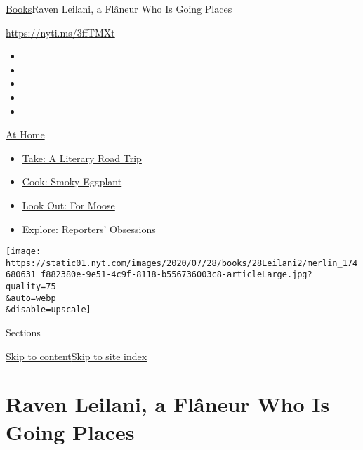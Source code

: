 \href{/section/books}{Books}\textbar{}Raven Leilani, a Flâneur Who Is
Going Places

\url{https://nyti.ms/3ffTMXt}

\begin{itemize}
\item
\item
\item
\item
\item
\end{itemize}

\href{https://www.nytimes.com/spotlight/at-home?action=click\&pgtype=Article\&state=default\&region=TOP_BANNER\&context=at_home_menu}{At
Home}

\begin{itemize}
\tightlist
\item
  \href{https://www.nytimes.com/2020/07/28/books/time-for-a-literary-road-trip.html?action=click\&pgtype=Article\&state=default\&region=TOP_BANNER\&context=at_home_menu}{Take:
  A Literary Road Trip}
\item
  \href{https://www.nytimes.com/2020/07/29/magazine/bored-with-your-home-cooking-some-smoky-eggplant-will-fix-that.html?action=click\&pgtype=Article\&state=default\&region=TOP_BANNER\&context=at_home_menu}{Cook:
  Smoky Eggplant}
\item
  \href{https://www.nytimes.com/2020/07/27/travel/moose-michigan-isle-royale.html?action=click\&pgtype=Article\&state=default\&region=TOP_BANNER\&context=at_home_menu}{Look
  Out: For Moose}
\item
  \href{https://www.nytimes.com/interactive/2020/at-home/even-more-reporters-editors-diaries-lists-recommendations.html?action=click\&pgtype=Article\&state=default\&region=TOP_BANNER\&context=at_home_menu}{Explore:
  Reporters' Obsessions}
\end{itemize}

\texttt{[image: https://static01.nyt.com/images/2020/07/28/books/28Leilani2/merlin\_174680631\_f882380e-9e51-4c9f-8118-b556736003c8-articleLarge.jpg?quality=75\\\&auto=webp\\\&disable=upscale]}

Sections

\protect\hyperlink{site-content}{Skip to
content}\protect\hyperlink{site-index}{Skip to site index}

\hypertarget{raven-leilani-a-fluxe2neur-who-is-going-places}{%
\section{Raven Leilani, a Flâneur Who Is Going
Places}\label{raven-leilani-a-fluxe2neur-who-is-going-places}}

